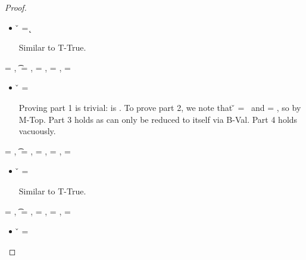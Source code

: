 \begin{lemma}
\begin{proof}
\begin{case}[T-Kw]
  \begin{itemize}
    \item[]
      \begin{subcase}[B-Val] \v{} = {\k{}}

        Similar to T-True.
      \end{subcase}
  \end{itemize}
\end{case}

\begin{case}[T-False]
\e{} = \false, \t{} = \False, \thenprop{\prop{}} = \botprop{}, \elseprop{\prop{}} = \topprop{}, \object{} = \emptyobject{}

\begin{itemize}
  \item[] 
    \begin{subcase}[B-Val]
      \v{} = \false{}

Proving part 1 is trivial: \object{} is \emptyobject. To prove part 2, we note that \v{} = \false\ 
and \elseprop{\prop{}} = \topprop{}, so \satisfies{\openv{}}{\elseprop{\prop{}}} by M-Top. 
Part 3 holds as \e{} can only be reduced to itself via B-Val.
Part 4 holds vacuously.
\end{subcase}

\end{itemize}
\end{case}

\begin{case}[T-Class] \e{} = {\class{}},
  \t{} = {\Value{\class{}}},
  \thenprop{\prop{}} = {\topprop{}},
  \elseprop{\prop{}} = {\botprop{}},
  \object{} = {\emptyobject{}}

  \begin{itemize}
    \item[]
      \begin{subcase}[B-Val] \v{} = {\class{}}

        Similar to T-True.
      \end{subcase}
  \end{itemize}
\end{case}

\begin{case}[T-Instance] \e{} = {\classvalue{\classhint{}} {\overrightarrow {\classfieldpair{\fld{}} {\v{}}}}},
  \t{} = {\class{}},
  \thenprop{\prop{}} = {\topprop{}},
  \elseprop{\prop{}} = {\botprop{}},
  \object{} = {\emptyobject{}}

  \begin{itemize}
    \item[]
      \begin{subcase}[B-Val] \v{} = {\classvalue{\classhint{}} {}}


\end{subcase}
\end{itemize}
\end{case}
\end{proof}
\end{lemma}
